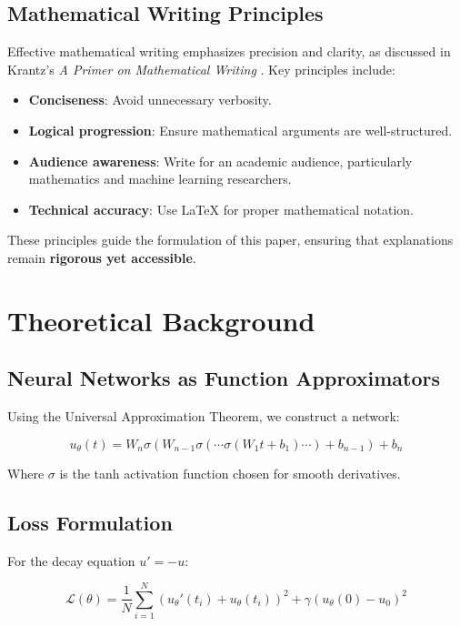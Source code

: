 \documentclass{article}
\begin{document}
\subsection{Mathematical Writing Principles}
Effective mathematical writing emphasizes precision and clarity, as discussed in Krantz's \textit{A Primer on Mathematical Writing} \cite{krantz2017}. Key principles include:
\begin{itemize}
    \item \textbf{Conciseness}: Avoid unnecessary verbosity.
    \item \textbf{Logical progression}: Ensure mathematical arguments are well-structured.
    \item \textbf{Audience awareness}: Write for an academic audience, particularly mathematics and machine learning researchers.
    \item \textbf{Technical accuracy}: Use LaTeX for proper mathematical notation.
\end{itemize}

These principles guide the formulation of this paper, ensuring that explanations remain \textbf{rigorous yet accessible}.

\newpage
\section{Theoretical Background}

\subsection{Neural Networks as Function Approximators}
Using the Universal Approximation Theorem, we construct a network:

\begin{equation}
u_\theta(t) = W_n\sigma(W_{n-1}\sigma(\cdots\sigma(W_1t + b_1)\cdots) + b_{n-1}) + b_n
\end{equation}

Where $\sigma$ is the tanh activation function chosen for smooth derivatives.

\subsection{Loss Formulation}
For the decay equation $u' = -u$:

\begin{equation}
\mathcal{L}(\theta) = \frac{1}{N}\sum_{i=1}^N (u_\theta'(t_i) + u_\theta(t_i))^2 + \gamma(u_\theta(0) - u_0)^2
\end{equation}
\end{document}
